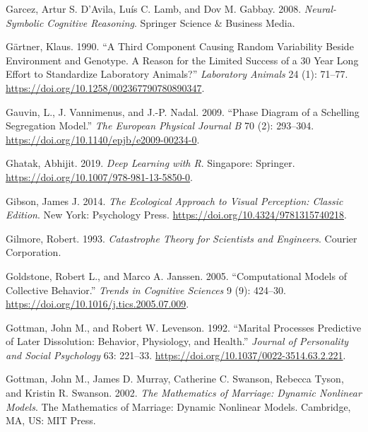 \documentclass[
  a4paper,
  DIV=11,
  numbers=noendperiod]{scrreprt}
\newlength{\cslhangindent}
\newlength{\cslentryspacingunit} %
\newenvironment{CSLReferences}[2] %
 {%
  \setlength{\parindent}{0pt}
  \ifodd #1
  \let\oldpar\par
  \def\par{\hangindent=\cslhangindent\oldpar}
  \fi
  \setlength{\parskip}{#2\cslentryspacingunit}
 }%
 {}
\begin{document}
\begin{CSLReferences}{1}{0}
\leavevmode{}%
Garcez, Artur S. D'Avila, Luís C. Lamb, and Dov M. Gabbay. 2008.
\emph{Neural-{Symbolic Cognitive Reasoning}}. {Springer Science \&
Business Media}.

\leavevmode{}%
Gärtner, Klaus. 1990. {``A Third Component Causing Random Variability
Beside Environment and Genotype. {A} Reason for the Limited Success of a
30 Year Long Effort to Standardize Laboratory Animals?''}
\emph{Laboratory Animals} 24 (1): 71--77.
\url{https://doi.org/10.1258/002367790780890347}.

\leavevmode{}%
Gauvin, L., J. Vannimenus, and J.-P. Nadal. 2009. {``Phase Diagram of a
{Schelling} Segregation Model.''} \emph{The European Physical Journal B}
70 (2): 293--304. \url{https://doi.org/10.1140/epjb/e2009-00234-0}.

\leavevmode{}%
Ghatak, Abhijit. 2019. \emph{Deep {Learning} with {R}}. {Singapore}:
{Springer}. \url{https://doi.org/10.1007/978-981-13-5850-0}.

\leavevmode{}%
Gibson, James J. 2014. \emph{The {Ecological Approach} to {Visual
Perception}: {Classic Edition}}. {New York}: {Psychology Press}.
\url{https://doi.org/10.4324/9781315740218}.

\leavevmode{}%
Gilmore, Robert. 1993. \emph{Catastrophe {Theory} for {Scientists} and
{Engineers}}. {Courier Corporation}.

\leavevmode{}%
Goldstone, Robert L., and Marco A. Janssen. 2005. {``Computational
Models of Collective Behavior.''} \emph{Trends in Cognitive Sciences} 9
(9): 424--30. \url{https://doi.org/10.1016/j.tics.2005.07.009}.

\leavevmode{}%
Gottman, John M., and Robert W. Levenson. 1992. {``Marital Processes
Predictive of Later Dissolution: {Behavior}, Physiology, and Health.''}
\emph{Journal of Personality and Social Psychology} 63: 221--33.
\url{https://doi.org/10.1037/0022-3514.63.2.221}.

\leavevmode{}%
Gottman, John M., James D. Murray, Catherine C. Swanson, Rebecca Tyson,
and Kristin R. Swanson. 2002. \emph{The Mathematics of Marriage:
{Dynamic} Nonlinear Models}. The Mathematics of Marriage: {Dynamic}
Nonlinear Models. {Cambridge, MA, US}: {MIT Press}.


\end{CSLReferences}
\end{document}
